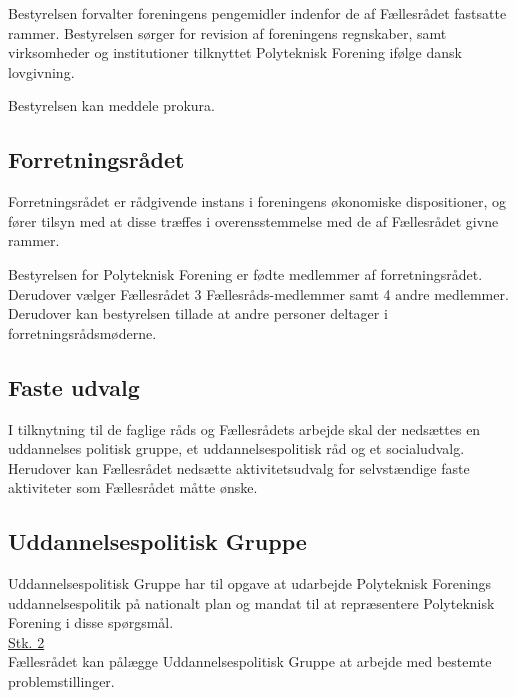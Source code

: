 \begin{list}
\item Bestyrelsen forvalter foreningens pengemidler indenfor de af Fællesrådet fastsatte rammer. Bestyrelsen sørger for revision af foreningens regnskaber, samt virksomheder og institutioner tilknyttet Polyteknisk Forening ifølge dansk lovgivning.

\item Bestyrelsen kan meddele prokura.

\subsection{Forretningsrådet}
\item Forretningsrådet er rådgivende instans i foreningens økonomiske dispositioner, og fører tilsyn med at disse træffes i overensstemmelse med de af Fællesrådet givne rammer.\\

\item Bestyrelsen for Polyteknisk Forening er fødte medlemmer af forretningsrådet. Derudover vælger Fællesrådet 3 Fællesråds-medlemmer samt 4 andre medlemmer. Derudover kan bestyrelsen tillade at andre personer deltager i forretningsrådsmøderne.

\subsection{Faste udvalg}
\item I tilknytning til de faglige råds og Fællesrådets arbejde skal der nedsættes en uddannelses politisk gruppe, et uddannelsespolitisk råd og et socialudvalg. Herudover kan Fællesrådet nedsætte aktivitetsudvalg for selvstændige faste aktiviteter som Fællesrådet måtte ønske.\\

\subsection{Uddannelsespolitisk Gruppe}
\item Uddannelsespolitisk Gruppe har til opgave at udarbejde Polyteknisk Forenings uddannelsespolitik på nationalt plan og mandat til at repræsentere Polyteknisk Forening i disse spørgsmål.\\

\underline{Stk. 2}\\
Fællesrådet kan pålægge Uddannelsespolitisk Gruppe at arbejde med bestemte problemstillinger.\\


\end{list}
